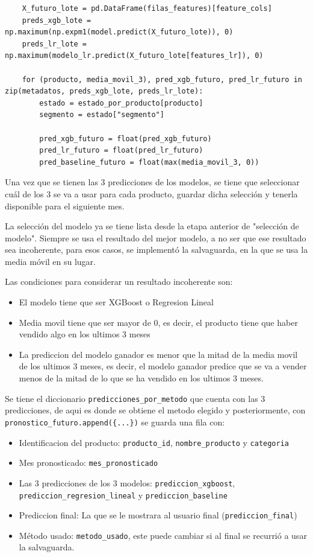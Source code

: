 \begin{verbatim}
    X_futuro_lote = pd.DataFrame(filas_features)[feature_cols]
    preds_xgb_lote = np.maximum(np.expm1(model.predict(X_futuro_lote)), 0)
    preds_lr_lote = np.maximum(modelo_lr.predict(X_futuro_lote[features_lr]), 0)

    for (producto, media_movil_3), pred_xgb_futuro, pred_lr_futuro in zip(metadatos, preds_xgb_lote, preds_lr_lote):
        estado = estado_por_producto[producto]
        segmento = estado["segmento"]

        pred_xgb_futuro = float(pred_xgb_futuro)
        pred_lr_futuro = float(pred_lr_futuro)
        pred_baseline_futuro = float(max(media_movil_3, 0))
\end{verbatim}

Una vez que se tienen las 3 predicciones de los modelos, se tiene que seleccionar cuál de los 3 se va a usar para cada producto, guardar dicha selección y tenerla disponible para el siguiente mes. 

La selección del modelo ya se tiene lista desde la etapa anterior de "selección de modelo". Siempre se usa el resultado del mejor modelo, a no ser que ese resultado sea incoherente, para esos casos, se implementó la salvaguarda, en la que se usa la media móvil en su lugar.

Las condiciones para considerar un resultado incoherente son:

\begin{itemize}
    \item El modelo tiene que ser XGBoost o Regresion Lineal
    \item Media movil tiene que ser mayor de 0, es decir, el producto tiene que haber vendido algo en los ultimos 3 meses
    \item La prediccion del modelo ganador es menor que la mitad de la media movil de los ultimos 3 meses, es decir, el modelo ganador predice que se va a vender menos de la mitad de lo que se ha vendido en los ultimos 3 meses.
\end{itemize}

Se tiene el diccionario \texttt{predicciones\_por\_metodo} que cuenta con las 3 predicciones, de aqui es donde se obtiene el metodo elegido y posteriormente, con \texttt{pronostico\_futuro.append(\{...\})} se guarda una fila con:

\begin{itemize}
    \item Identificacion del producto: \texttt{producto\_id}, \texttt{nombre\_producto} y \texttt{categoria}
    \item Mes pronosticado: \texttt{mes\_pronosticado}
    \item Las 3 predicciones de los 3 modelos: \texttt{prediccion\_xgboost}, \texttt{prediccion\_regresion\_lineal} y \texttt{prediccion\_baseline}
    \item Prediccion final: La que se le mostrara al usuario final (\texttt{prediccion\_final})
    \item Método usado: \texttt{metodo\_usado}, este puede cambiar si al final se recurrió a usar la salvaguarda.
\end{itemize}

